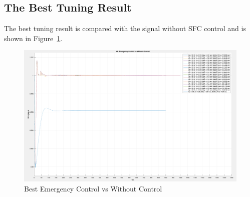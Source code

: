 \subsection{The Best Tuning Result} %
The best tuning result is compared with the signal without SFC control and is shown in Figure~\ref{6_4_2_best}.

\begin{figure}[htbp]
\centering
\includegraphics[width = .891\textwidth]{figure/6_4_2_best.png}
\caption{Best Emergency Control vs Without Control}
\label{6_4_2_best}
\end{figure}